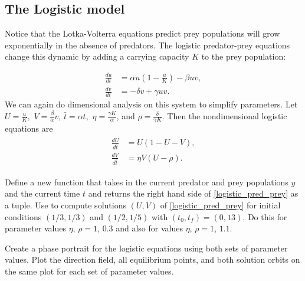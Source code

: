 \subsection*{The Logistic model}
Notice that the Lotka-Volterra equations predict prey populations will grow exponentially in the absence of predators. The logistic predator-prey equations change this dynamic by adding a carrying capacity $K$ to the prey population:%

\begin{align*}
	\frac{du}{dt} &= \alpha u\left(1 -\frac{u}{K}\right) - \beta uv,\\
	\frac{dv}{dt} &= -\delta v + \gamma uv.
\end{align*}
We can again do dimensional analysis on this system to simplify parameters. Let $U = \frac{u}{K},$ $V = \frac{\beta}{\alpha}v$, $\bar{t} = \alpha t,$  $\eta = \frac{\gamma K}{\alpha}$, and $\rho = \frac{\delta}{\gamma K}$.
Then the nondimensional logistic equations are
\begin{align}
	\begin{split}
	\frac{dU}{d\bar{t}} &= U(1-U-V),\\
	\frac{dV}{d\bar{t}} &= \eta V (U-\rho).
	\end{split} \label{logistic_pred_prey}
\end{align}

\begin{problem}
Define a new function  that takes in the current predator and prey populations $y$ and the current time $t$ and returns the right hand side of \eqref{logistic_pred_prey} as a tuple. Use  to compute solutions $(U,V)$ of \eqref{logistic_pred_prey}
for initial conditions $(1/3, 1/3)$ and $(1/2, 1/5)$ with $(t_0,t_f)=(0,13)$.
Do this for parameter values $\eta$, $\rho = 1$, $0.3$ and also for values $\eta$, $\rho = 1$, $1.1$.

Create a phase portrait for the logistic equations using both sets of parameter values.
Plot the direction field, all equilibrium points, and both solution orbits on the same plot for each set of parameter values.
\end{problem} 

